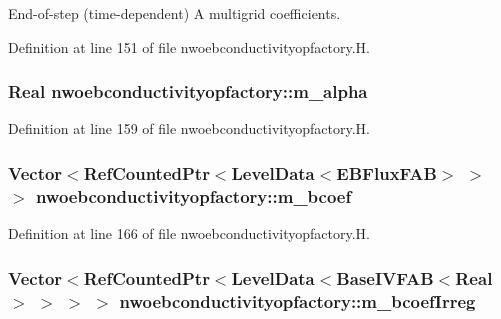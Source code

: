 End-\/of-\/step (time-\/dependent) A multigrid coefficients. 



Definition at line 151 of file nwoebconductivityopfactory.\+H.

\subsubsection[{\texorpdfstring{m\+\_\+alpha}{m_alpha}}]{\setlength{\rightskip}{0pt plus 5cm}Real nwoebconductivityopfactory\+::m\+\_\+alpha\hspace{0.3cm}{\ttfamily [protected]}}\hypertarget{classnwoebconductivityopfactory_a869f008bc3c252ce50bbc741118dd367}{}\label{classnwoebconductivityopfactory_a869f008bc3c252ce50bbc741118dd367}


Definition at line 159 of file nwoebconductivityopfactory.\+H.

\subsubsection[{\texorpdfstring{m\+\_\+bcoef}{m_bcoef}}]{\setlength{\rightskip}{0pt plus 5cm}Vector$<$Ref\+Counted\+Ptr$<$Level\+Data$<$E\+B\+Flux\+F\+AB$>$ $>$ $>$ nwoebconductivityopfactory\+::m\+\_\+bcoef\hspace{0.3cm}{\ttfamily [protected]}}\hypertarget{classnwoebconductivityopfactory_a249acbf22e8c4cffc323ba372d4d9427}{}\label{classnwoebconductivityopfactory_a249acbf22e8c4cffc323ba372d4d9427}


Definition at line 166 of file nwoebconductivityopfactory.\+H.

\subsubsection[{\texorpdfstring{m\+\_\+bcoef\+Irreg}{m_bcoefIrreg}}]{\setlength{\rightskip}{0pt plus 5cm}Vector$<$Ref\+Counted\+Ptr$<$Level\+Data$<$Base\+I\+V\+F\+AB$<$Real$>$ $>$ $>$ $>$ nwoebconductivityopfactory\+::m\+\_\+bcoef\+Irreg\hspace{0.3cm}{\ttfamily [protected]}}\hypertarget{classnwoebconductivityopfactory_aeed39483ed17f89fe179d4e8a30d4009}{}\label{classnwoebconductivityopfactory_aeed39483ed17f89fe179d4e8a30d4009}



